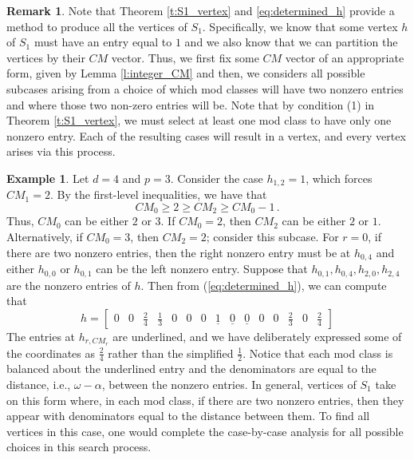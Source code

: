 \documentclass[12pt]{amsart}
\theoremstyle{definition}
\newtheorem{example}[thm]{Example}
\newtheorem{remark}[thm]{Remark}
\numberwithin{equation}{section}
\renewcommand\>{\rangle}
\newcommand\<{\langle}
\newcommand\0{\mathbf{0}}
\begin{document}
\begin{remark}
	Note that Theorem \ref{t:S1_vertex} and \eqref{eq:determined_h} provide a method to produce all the vertices of $S_1$. 
	Specifically, we know that some vertex $h$ of $S_1$ must have an entry equal to $1$ and we also know that we can partition the vertices by their $CM$ vector.
	Thus, we first fix some $CM$ vector of an appropriate form, given by Lemma \ref{l:integer_CM} and then, we considers all possible subcases arising from a choice of which mod classes will have two nonzero entries and where those two non-zero entries will be. Note that by condition (1) in Theorem \ref{t:S1_vertex}, we must select at least one mod class to have only one nonzero entry.
	Each of the resulting cases will result in a vertex, and every vertex arises via this process.
\end{remark}


\begin{example}\label{ex:vertexmethod}
	Let $d = 4$ and $p = 3$. 
	Consider the case $h_{1,2} = 1$, which forces $CM_1=2$.
	By the first-level inequalities, we have that 
	\[
	CM_0 \geq 2 \geq CM_2 \geq CM_0 -1 \, .
	\]
	Thus, $CM_0$ can be either $2$ or $3$.
	If $CM_0=2$, then $CM_2$ can be either $2$ or $1$.
	Alternatively, if $CM_0 = 3$, then $CM_2 = 2$; consider this subcase.
	For $r = 0$, if there are two nonzero entries, then the right nonzero entry must be at $h_{0,4}$ and either $h_{0,0}$ or $h_{0,1}$ can be the left nonzero entry. 
	Suppose that $h_{0,1}, h_{0,4}, h_{2,0}, h_{2,4}$ are the nonzero entries of $h$. 
	Then from (\ref{eq:determined_h}), we can compute that
	\[h = \begin{bmatrix}
		0 &  0  & \frac{2}{4}&
		\frac{1}{3} & 0 & 0 &
		0 & \underline{1} & \underline{0} & 
		\underline{0} & 0 & 0 &
		\frac{2}{3} & 0 & \frac{2}{4}
	\end{bmatrix}\]
	The entries at $h_{r, CM_r}$ are underlined, and we have deliberately expressed some of the coordinates as $\tfrac{2}{4}$ rather than the simplified $\tfrac{1}{2}$.
	Notice that each mod class is balanced about the underlined entry and the denominators are equal to the distance, i.e., $\omega - \alpha$, between the nonzero entries. 
	In general, vertices of $S_1$ take on this form where, in each mod class, if there are two nonzero entries, then they appear with denominators equal to the distance between them.
	To find all vertices in this case, one would complete the case-by-case analysis for all possible choices in this search process.
\end{example}
\end{document}
